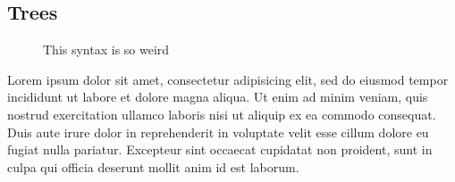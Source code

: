 \documentclass{article}
\begin{document}
        \subsection{Trees}
            \begin{figure}[H]
                \centering
                \caption{This syntax is so weird}
            \end{figure}
            Lorem ipsum dolor sit amet, consectetur adipisicing elit, sed do eiusmod
            tempor incididunt ut labore et dolore magna aliqua. Ut enim ad minim veniam,
            quis nostrud exercitation ullamco laboris nisi ut aliquip ex ea commodo
            consequat. Duis aute irure dolor in reprehenderit in voluptate velit esse
            cillum dolore eu fugiat nulla pariatur. Excepteur sint occaecat cupidatat non
            proident, sunt in culpa qui officia deserunt mollit anim id est laborum.\\
\end{document}
